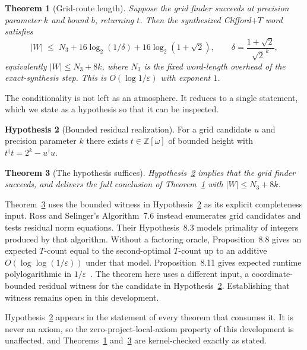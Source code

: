 \documentclass[aps,pra,reprint,nofootinbib,superscriptaddress]{revtex4-2}
\theoremstyle{plain}
\newtheorem{theorem}{Theorem}
\theoremstyle{definition}
\newtheorem{hypothesis}[theorem]{Hypothesis}
\begin{document}
\begin{theorem}[Grid-route length]
\label{thm:rslength}
Suppose the grid finder succeeds at precision parameter $k$ and bound $b$,
returning $t$. Then the synthesized Clifford$+T$ word satisfies
\[
  \lvert W\rvert \;\le\; N_3 + 16\log_2(1/\delta) + 16\log_2(1+\sqrt 2),
  \qquad \delta = \frac{1+\sqrt 2}{\sqrt 2^{\,k}},
\]
equivalently $\lvert W\rvert \le N_3 + 8k$, where $N_3$ is the fixed word-length
overhead of the exact-synthesis step. This is $O(\log 1/\varepsilon)$ with
exponent $1$.
\end{theorem}

The conditionality is not left as an atmosphere. It reduces to a single
statement, which we state as a hypothesis so that it can be inspected.

\begin{hypothesis}[Bounded residual realization]
\label{hyp:residual}
For a grid candidate $u$ and precision parameter $k$ there exists
$t \in \mathbb Z[\omega]$ of bounded height with
$t^{\dagger}t = 2^k - u^{\dagger}u$.
\end{hypothesis}

\begin{theorem}[The hypothesis suffices]
\label{thm:rssynth}
Hypothesis~\ref{hyp:residual} implies that the grid finder succeeds, and
delivers the full conclusion of Theorem~\ref{thm:rslength} with
$\lvert W\rvert \le N_3 + 8k$.
\end{theorem}

Theorem~\ref{thm:rssynth} uses the bounded witness in
Hypothesis~\ref{hyp:residual} as its explicit completeness input.
Ross and Selinger's Algorithm~7.6 instead enumerates grid candidates and
tests residual norm equations. Their Hypothesis~8.3 models primality of
integers produced by that algorithm. Without a factoring oracle,
Proposition~8.8 gives an expected $T$-count equal to the second-optimal
$T$-count up to an additive $O(\log\log(1/\varepsilon))$ under that model.
Proposition~8.11 gives expected runtime polylogarithmic in
$1/\varepsilon$~\cite{RossSelinger2016}. The theorem here uses a different input,
a coordinate-bounded residual witness for the candidate in
Hypothesis~\ref{hyp:residual}. Establishing that witness remains open in
this development.

Hypothesis~\ref{hyp:residual} appears in the statement of every theorem that
consumes it. It is never an axiom, so the zero-project-local-axiom property of
this development is unaffected, and Theorems~\ref{thm:rslength}
and~\ref{thm:rssynth} are kernel-checked exactly as stated.
\end{document}
